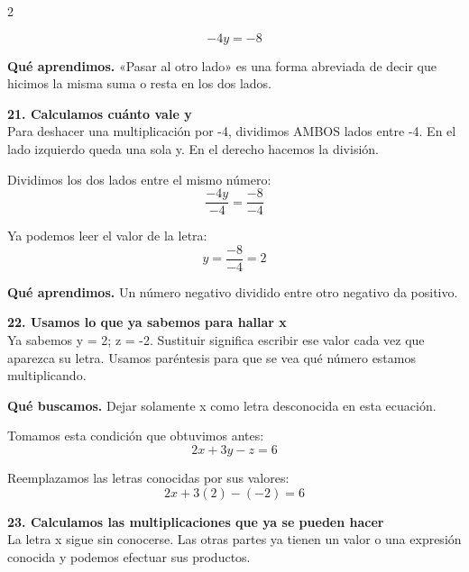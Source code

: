 \documentclass[11pt,a4paper,landscape]{article}
\begin{document}
\begin{multicols*}{2}
\begin{minipage}{\linewidth}
\[-4y=-8\]
\par\smallskip\textbf{Qué aprendimos.} «Pasar al otro lado» es una forma abreviada de decir que hicimos la misma suma o resta en los dos lados.
\end{minipage}\par\medskip
\noindent\begin{minipage}{\linewidth}\textbf{21. Calculamos cuánto vale y}\\[2pt]Para deshacer una multiplicación por -4, dividimos AMBOS lados entre -4. En el lado izquierdo queda una sola y. En el derecho hacemos la división.
\par\smallskip Dividimos los dos lados entre el mismo número:
\[\frac{-4y}{-4}=\frac{-8}{-4}\]
\par\smallskip Ya podemos leer el valor de la letra:
\[y=\frac{-8}{-4}=2\]
\par\smallskip\textbf{Qué aprendimos.} Un número negativo dividido entre otro negativo da positivo.
\end{minipage}\par\medskip
\noindent\begin{minipage}{\linewidth}\textbf{22. Usamos lo que ya sabemos para hallar x}\\[2pt]Ya sabemos y = 2; z = -2. Sustituir significa escribir ese valor cada vez que aparezca su letra. Usamos paréntesis para que se vea qué número estamos multiplicando.
\par\smallskip\textbf{Qué buscamos.} Dejar solamente x como letra desconocida en esta ecuación.
\par\smallskip Tomamos esta condición que obtuvimos antes:
\[2x + 3y - z = 6\]
\par\smallskip Reemplazamos las letras conocidas por sus valores:
\[2x + 3\left(2\right) - \left(-2\right)=6\]
\end{minipage}\par\medskip
\noindent\begin{minipage}{\linewidth}\textbf{23. Calculamos las multiplicaciones que ya se pueden hacer}\\[2pt]La letra x sigue sin conocerse. Las otras partes ya tienen un valor o una expresión conocida y podemos efectuar sus productos.
\par{}\par\smallskip

\end{minipage}
\end{multicols*}
\end{document}
